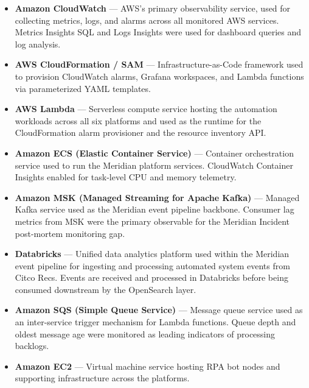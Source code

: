 \begin{itemize}

      \item \textbf{Amazon CloudWatch} --- AWS's primary observability
          service, used for collecting metrics, logs, and alarms across
          all monitored AWS services. Metrics Insights SQL and Logs
          Insights were used for dashboard queries and log analysis.

      \item \textbf{AWS CloudFormation / SAM} --- Infrastructure-as-Code
          framework used to provision CloudWatch alarms, Grafana
          workspaces, and Lambda functions via parameterized YAML templates.

    \item \textbf{AWS Lambda} --- Serverless compute service hosting
          the automation workloads across all six platforms and used
          as the runtime for the CloudFormation alarm provisioner and
          the resource inventory API.

    \item \textbf{Amazon ECS (Elastic Container Service)} ---
          Container orchestration service used to run the Meridian
          platform services. CloudWatch Container Insights enabled
          for task-level CPU and memory telemetry.

    \item \textbf{Amazon MSK (Managed Streaming for Apache Kafka)} ---
          Managed Kafka service used as the Meridian event pipeline
          backbone. Consumer lag metrics from MSK were the primary
          observable for the Meridian Incident post-mortem monitoring gap.

    \item \textbf{Databricks} --- Unified data analytics platform used
          within the Meridian event pipeline for ingesting and processing
          automated system events from Citco Recs. Events are received
          and processed in Databricks before being consumed downstream
          by the OpenSearch layer.

    \item \textbf{Amazon SQS (Simple Queue Service)} --- Message queue
          service used as an inter-service trigger mechanism for Lambda
          functions. Queue depth and oldest message age were monitored
          as leading indicators of processing backlogs.

    \item \textbf{Amazon EC2} --- Virtual machine service hosting
          RPA bot nodes and supporting infrastructure across the platforms.


\end{itemize}
